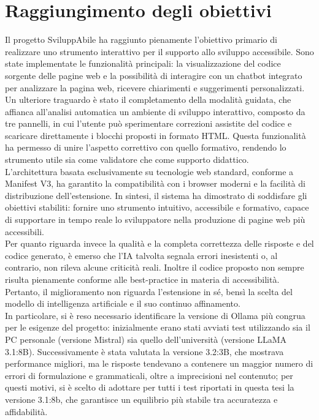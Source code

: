 \section{Raggiungimento degli obiettivi}
\noindent Il progetto SviluppAbile ha raggiunto pienamente l’obiettivo primario di realizzare uno strumento interattivo per il supporto allo sviluppo accessibile. Sono state implementate le funzionalità principali: la visualizzazione del codice sorgente delle pagine web e la possibilità di interagire con un chatbot integrato per analizzare la pagina web, ricevere chiarimenti e suggerimenti personalizzati.\\
Un ulteriore traguardo è stato il completamento della modalità guidata, che affianca all’analisi automatica un ambiente di sviluppo interattivo, composto da tre pannelli, in cui l’utente può sperimentare correzioni assistite del codice e scaricare direttamente i blocchi proposti in formato HTML. Questa funzionalità ha permesso di unire l’aspetto correttivo con quello formativo, rendendo lo strumento utile sia come validatore che come supporto didattico.\\
L’architettura basata esclusivamente su tecnologie web standard, conforme a Manifest V3, ha garantito la compatibilità con i browser moderni e la facilità di distribuzione dell’estensione. 
In sintesi, il sistema ha dimostrato di soddisfare gli obiettivi stabiliti: fornire uno strumento intuitivo, accessibile e formativo, capace di supportare in tempo reale lo sviluppatore nella produzione di pagine web più accessibili.\\
Per quanto riguarda invece la qualità e la completa correttezza delle risposte e del codice generato, è emerso che l’IA talvolta segnala errori inesistenti o, al contrario, non rileva alcune criticità reali. Inoltre il codice proposto non sempre risulta pienamente conforme alle best-practice in materia di accessibilità. Pertanto, il miglioramento non riguarda l’estensione in sé, bensì la scelta del modello di intelligenza artificiale e il suo continuo affinamento.\\
In particolare, si è reso necessario identificare la versione di Ollama più congrua per le esigenze del progetto: inizialmente erano stati avviati test utilizzando sia il PC personale (versione Mistral) sia quello dell’università (versione LLaMA 3.1:8B). Successivamente è stata valutata la versione 3.2:3B, che mostrava performance migliori, ma le risposte tendevano a contenere un maggior numero di errori di formulazione e grammaticali, oltre a imprecisioni nel contenuto; per questi motivi, si è scelto di adottare per tutti i test riportati in questa tesi la versione 3.1:8b, che garantisce un equilibrio più stabile tra accuratezza e affidabilità.

